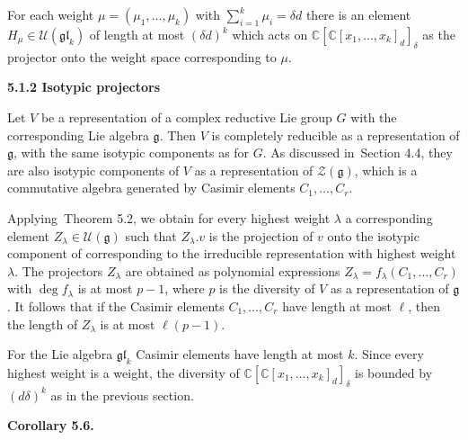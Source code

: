 \documentclass[10pt,a4paper]{article}
\begin{document}
For each weight $\mu=(\mu_{1},\dots,\mu_{k})$ with $\sum_{i=1}^{k}\mu_{i}=\delta d$ there is an element $H_{\mu}\in\mathcal{U}(\mathfrak{gl}_{k})$ of length at most $(\delta d)^{k}$ which acts on $\mathbb{C}[\mathbb{C}[x_{1},\ldots,x_{k}]_{d}]_{\delta}$ as the projector onto the weight space corresponding to $\mu$.







\par\medskip\noindent\textbf{5.1.2 Isotypic projectors}\par




Let $V$ be a representation of a complex reductive Lie group $G$ with the corresponding Lie algebra $\mathfrak{g}$.
Then $V$ is completely reducible as a representation of $\mathfrak{g}$, with the same isotypic components as for $G$.
As discussed in Section 4.4, they are also isotypic components of $V$ as a representation of $\mathcal{Z}(\mathfrak{g})$, which is a commutative algebra generated by Casimir elements $C_{1},\dots,C_{r}$.





Applying Theorem 5.2, we obtain for every highest weight $\lambda$ a corresponding element $Z_{\lambda}\in\mathcal{U}(\mathfrak{g})$ such that $Z_{\lambda}.v$ is the projection of $v$ onto the isotypic component of corresponding to the irreducible representation with highest weight $\lambda$.
The projectors $Z_{\lambda}$ are obtained as polynomial expressions $Z_{\lambda}=f_{\lambda}(C_{1},\dots,C_{r})$ with $\deg f_{\lambda}$ is at most $p-1$, where $p$ is the diversity of $V$ as a representation of $\mathfrak{g}$.
It follows that if the Casimir elements $C_{1},\dots,C_{r}$ have length at most $\ell$, then the length of $Z_{\lambda}$ is at most $\ell(p-1)$.





For the Lie algebra $\mathfrak{gl}_{k}$ Casimir elements have length at most $k$.
Since every highest weight is a weight, the diversity of $\mathbb{C}[\mathbb{C}[x_{1},\dots,x_{k}]_{d}]_{\delta}$ is bounded by $(d\delta)^{k}$ as in the previous section.





\par\medskip\noindent\textbf{Corollary 5.6.}\par
\end{document}
